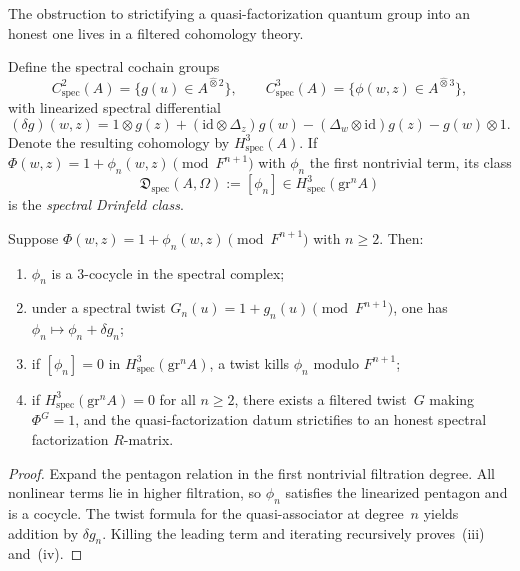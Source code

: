 The obstruction to strictifying a quasi-factorization quantum
group into an honest one lives in a filtered cohomology theory.

\begin{definition}
\label{def:spectral-drinfeld-class}
Define the spectral cochain groups
\[
 C^2_{\mathrm{spec}}(A) = \{g(u) \in A^{\widehat\otimes 2}\},
 \qquad
 C^3_{\mathrm{spec}}(A) = \{\phi(w,z) \in A^{\widehat\otimes 3}\},
\]
with linearized spectral differential
\[
 (\delta g)(w,z)
 =
 1 \otimes g(z)
 + (\mathrm{id} \otimes \Delta_z)g(w)
 - (\Delta_w \otimes \mathrm{id})g(z)
 - g(w) \otimes 1.
\]
Denote the resulting cohomology by $H^3_{\mathrm{spec}}(A)$.
If
$\Phi(w,z) = 1 + \phi_n(w,z) \pmod{F^{n+1}}$
with $\phi_n$ the first nontrivial term, its class
\[
 \mathfrak{D}_{\mathrm{spec}}(A,\Omega)
 := [\phi_n]
 \in H^3_{\mathrm{spec}}(\mathrm{gr}^n A)
\]
is the \emph{spectral Drinfeld class}.
\end{definition}

\begin{theorem}
\label{thm:spectral-strictification-cohomology}
Suppose $\Phi(w,z) = 1 + \phi_n(w,z) \pmod{F^{n+1}}$ with
$n \ge 2$. Then:
\begin{enumerate}[label=\textup{(\roman*)}]
\item $\phi_n$ is a $3$-cocycle in the spectral complex;
\item under a spectral twist
 $G_n(u) = 1 + g_n(u) \pmod{F^{n+1}}$, one has
 $\phi_n \mapsto \phi_n + \delta g_n$;
\item if $[\phi_n] = 0$ in
 $H^3_{\mathrm{spec}}(\mathrm{gr}^n A)$, a twist
 kills $\phi_n$ modulo $F^{n+1}$;
\item if $H^3_{\mathrm{spec}}(\mathrm{gr}^n A) = 0$ for all
 $n \ge 2$, there exists a filtered twist~$G$ making
 $\Phi^G = 1$, and the quasi-factorization datum
 strictifies to an honest spectral factorization $R$-matrix.
\end{enumerate}
\end{theorem}

\begin{proof}
Expand the pentagon relation in the first nontrivial filtration
degree. All nonlinear terms lie in higher filtration, so
$\phi_n$ satisfies the linearized pentagon and is a cocycle.
The twist formula for the quasi-associator at degree~$n$
yields addition by $\delta g_n$. Killing the leading term
and iterating recursively proves~(iii) and~(iv).
\end{proof}

